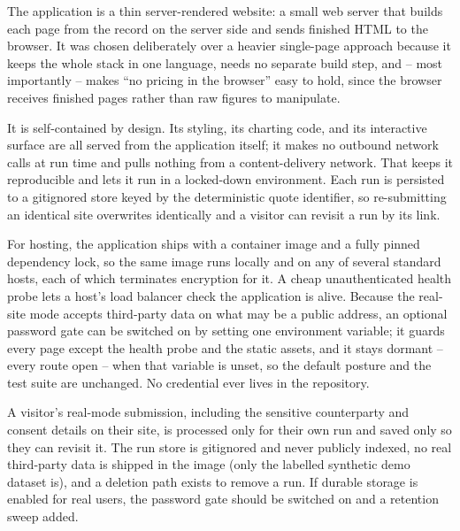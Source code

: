 The application is a thin server-rendered website: a small web server that builds each page from the record on the server side and sends finished HTML to the browser. It was chosen deliberately over a heavier single-page approach because it keeps the whole stack in one language, needs no separate build step, and -- most importantly -- makes ``no pricing in the browser'' easy to hold, since the browser receives finished pages rather than raw figures to manipulate.

It is self-contained by design. Its styling, its charting code, and its interactive surface are all served from the application itself; it makes no outbound network calls at run time and pulls nothing from a content-delivery network. That keeps it reproducible and lets it run in a locked-down environment. Each run is persisted to a gitignored store keyed by the deterministic quote identifier, so re-submitting an identical site overwrites identically and a visitor can revisit a run by its link.

For hosting, the application ships with a container image and a fully pinned dependency lock, so the same image runs locally and on any of several standard hosts, each of which terminates encryption for it. A cheap unauthenticated health probe lets a host's load balancer check the application is alive. Because the real-site mode accepts third-party data on what may be a public address, an optional password gate can be switched on by setting one environment variable; it guards every page except the health probe and the static assets, and it stays dormant -- every route open -- when that variable is unset, so the default posture and the test suite are unchanged. No credential ever lives in the repository.

\begin{caution}
A visitor's real-mode submission, including the sensitive counterparty and consent details on their site, is processed only for their own run and saved only so they can revisit it. The run store is gitignored and never publicly indexed, no real third-party data is shipped in the image (only the labelled synthetic demo dataset is), and a deletion path exists to remove a run. If durable storage is enabled for real users, the password gate should be switched on and a retention sweep added.
\end{caution}

